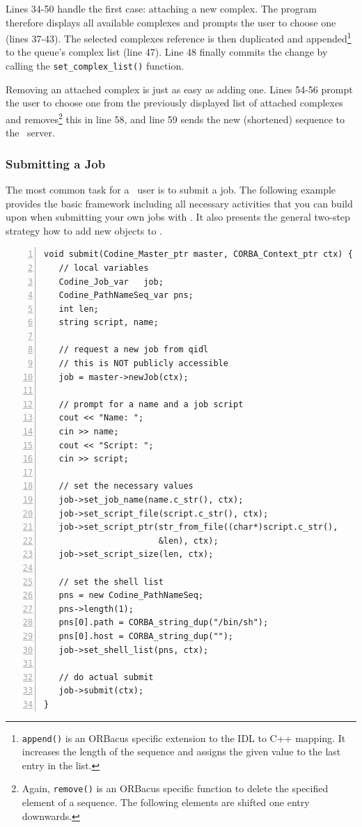 Lines 34-50 handle the first case: attaching a new complex. The program
therefore displays all available complexes and prompts the user to choose one
(lines 37-43). The selected complexes reference is then duplicated and
appended\footnote{\texttt{append()} is an ORBacus specific extension
to the IDL to
C++ mapping. It increases the length of the sequence and assigns the given
value to the last entry in the list.}
to the queue's complex list (line 47). Line 48 finally commits the change by
calling the \texttt{set\_complex\_list()} function.

Removing an attached complex is just as easy as adding one. Lines 54-56
prompt the user to choose one from the previously displayed list of attached
complexes and removes\footnote{Again, \texttt{remove()} is an ORBacus
specific function to delete
the specified element of a sequence. The following elements are shifted one
entry downwards.}
this in line 58, and line 59 sends the new (shortened) sequence to the \qidl\
server.

\subsubsection{Submitting a Job}
The most common task for a \codine\ user is to submit a job.
The following example provides the
basic framework including all necessary activities that you can build upon
when submitting your own jobs with \qidl. It also presents the general
two-step strategy how to add new objects to \qidl.

\begin{Verbatim}[frame=lines, numbers=left, fontsize=\small, framerule=1mm]
void submit(Codine_Master_ptr master, CORBA_Context_ptr ctx) {
   // local variables
   Codine_Job_var   job;
   Codine_PathNameSeq_var pns;
   int len;
   string script, name;
    
   // request a new job from qidl
   // this is NOT publicly accessible
   job = master->newJob(ctx);
   
   // prompt for a name and a job script
   cout << "Name: ";
   cin >> name;
   cout << "Script: ";
   cin >> script;

   // set the necessary values
   job->set_job_name(name.c_str(), ctx);
   job->set_script_file(script.c_str(), ctx);
   job->set_script_ptr(str_from_file((char*)script.c_str(),
                       &len), ctx);
   job->set_script_size(len, ctx);
   
   // set the shell list
   pns = new Codine_PathNameSeq;
   pns->length(1);
   pns[0].path = CORBA_string_dup("/bin/sh");
   pns[0].host = CORBA_string_dup("");
   job->set_shell_list(pns, ctx);

   // do actual submit
   job->submit(ctx);
}
\end{Verbatim}

